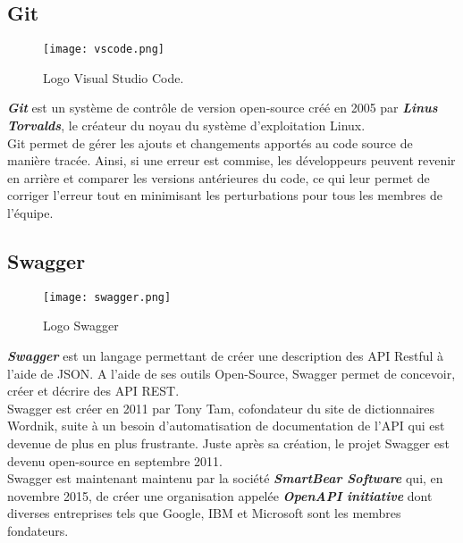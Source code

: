 \subsection{Git}
\vspace{1cm}
\begin{figure}[H]
    \centering
    \texttt{[image: vscode.png]}
    \vspace{1cm}
    \captionsetup{justification=centering}

    \caption{Logo Visual Studio Code.}
    \label{fig:vscode_logo}
\end{figure}
\textit{\textbf{Git}} \cite{git} est un système de contrôle de version open-source créé en 2005 par \textit{\textbf{Linus Torvalds}}, le créateur du noyau du système d'exploitation Linux.\\
\noindent Git permet de gérer les ajouts et changements apportés au code source de manière tracée. Ainsi, si une erreur est commise, les développeurs peuvent revenir en arrière et comparer les versions antérieures du code, ce qui leur permet de corriger l'erreur tout en minimisant les perturbations pour tous les membres de l'équipe.
\subsection{Swagger}
\vspace{1cm}
\begin{figure}[H]
    \centering
    \texttt{[image: swagger.png]}
    \vspace{1cm}
    \captionsetup{justification=centering}

    \caption{Logo Swagger}
    \label{fig:swagger_logo}
\end{figure}
\textit{\textbf{Swagger}} \cite{swagger} est un langage permettant de créer une description des API Restful à l'aide de JSON. A l'aide de ses outils Open-Source, Swagger permet de concevoir, créer et décrire des API REST.\\
\noindent Swagger est créer en 2011 par Tony Tam, cofondateur du site de dictionnaires Wordnik, suite à un besoin d'automatisation de documentation de l'API qui est devenue de plus en plus frustrante. Juste après sa création, le projet Swagger est devenu open-source en septembre 2011.\\
\noindent Swagger est maintenant maintenu par la société \textit{\textbf{SmartBear Software}} qui, en novembre 2015, de créer une organisation appelée \textit{\textbf{OpenAPI initiative}} dont diverses entreprises tels que Google, IBM et Microsoft sont les membres fondateurs.\\
